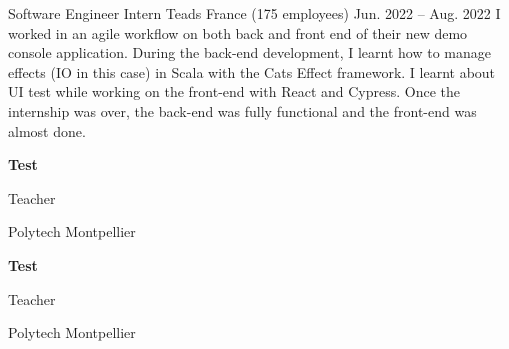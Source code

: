 \documentclass[11pt]{spidercv}
\newcommand{\ul}[1]{%
  \uline{\phantom{#1}}%
  \llap{\contour{white}{#1}}%
}
\begin{document}
\begin{MainPart}
  \Experience
  {\ColorHighlight}
  {Software Engineer Intern}
  {Teads France (175 employees)}
  {Jun. 2022 -- Aug. 2022}{
    I worked in an agile workflow on both back and front end of their new demo console application. During the back-end development, I learnt how to manage effects (IO in this case) in Scala with the Cats Effect framework. I learnt about UI test while working on the front-end with React and Cypress. Once the internship was over, the back-end was fully functional and the front-end was almost done.
  }

  \vspace{0.4cm}
  \begin{minipage}{0.45\linewidth}
    \begin{framed}
      \textbf{Test}

      Teacher

      Polytech Montpellier
    \end{framed}
  \end{minipage}
  \hfill
  \begin{minipage}{0.45\linewidth}
    \begin{framed}
      \textbf{Test}

      Teacher

      Polytech Montpellier
    \end{framed}
  \end{minipage}
  \hfill

\end{MainPart}
\end{document}
